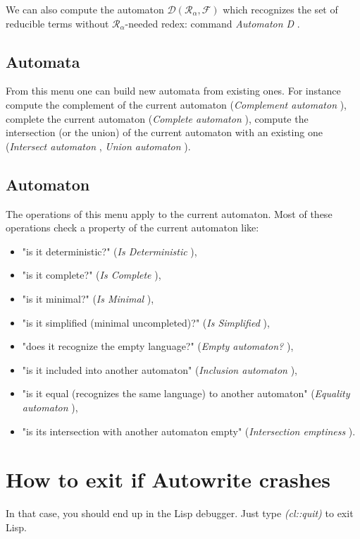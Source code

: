 \documentclass[11pt]{llncs}
\newcommand{\DD}{\mathcal{D}}
\newcommand{\RR}{\mathcal{R}}
\newcommand{\RRa}{{\RR_\alpha}}
\newcommand{\FF}{\mathcal{F}}
\def\autocom#1{\textsl{#1 }}
\begin{document}
We can also compute the automaton $\DD(\RRa,\FF)$ which
recognizes the set of reducible terms without $\RRa$-needed
redex: command \autocom{Automaton D}.

\subsection{Automata}
From this menu one can build new automata from existing ones. 
For instance
compute the complement of the current automaton 
(\autocom{Complement automaton}), complete the current automaton 
(\autocom{Complete automaton}), compute the intersection (or the union)
of the current automaton with an existing one (\autocom{Intersect automaton},
\autocom{Union automaton}).

\subsection{Automaton}
The operations of this menu apply to the current automaton.
Most of these operations check a property of the current automaton like:
\begin{itemize}
\item "is it deterministic?" (\autocom{Is Deterministic}),
\item "is it complete?" (\autocom{Is Complete}),
\item "is it minimal?" (\autocom{Is Minimal}),
\item "is it simplified (minimal uncompleted)?" (\autocom{Is Simplified}),
\item "does it recognize the empty language?" (\autocom{Empty automaton?}),
\item "is it included into another automaton" (\autocom{Inclusion automaton}), 
\item "is it equal (recognizes the same language) to another automaton" 
(\autocom{Equality automaton}), 
\item "is its intersection with another automaton empty"
(\autocom{Intersection emptiness}).

\end{itemize}

\section{How to exit if Autowrite crashes}
In that case, you should end up in the Lisp debugger. 
Just type \autocom{(cl::quit)} to exit Lisp.

\end{document}
